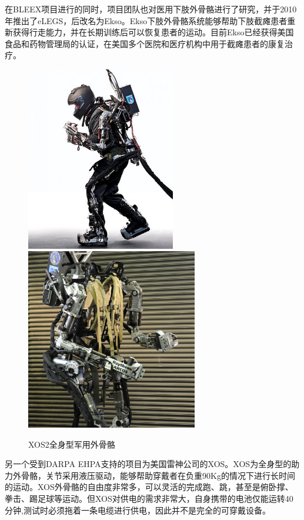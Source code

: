 在BLEEX项目进行的同时，项目团队也对医用下肢外骨骼进行了研究，并于2010年推出了eLEGS\cite{p9}，后改名为Ekso。Ekso下肢外骨骼系统能够帮助下肢截瘫患者重新获得行走能力，并在长期训练后可以恢复患者的运动。目前Ekso已经获得美国食品和药物管理局的认证，在美国多个医院和医疗机构中用于截瘫患者的康复治疗。
\begin{figure}[htb]
    \label{fig:sub1}{\includegraphics[width=6.5cm]{fig/f6_XOS.jpg}}\quad
    \label{fig:sub2}{\includegraphics[width=7.5cm]{fig/f7_XOS.jpg}}
    \caption{XOS2全身型军用外骨骼\cite{p8}}
    \label{fig:subfigs}
\end{figure}

另一个受到DARPA EHPA支持的项目为美国雷神公司的XOS\cite{p8}。XOS为全身型的助力外骨骼，关节采用液压驱动，能够帮助穿戴者在负重90Kg的情况下进行长时间的运动。XOS外骨骼的自由度非常多，可以灵活的完成跑、跳，甚至是俯卧撑、拳击、踢足球等运动。但XOS对供电的需求非常大，自身携带的电池仅能运转40分钟,测试时必须拖着一条电缆进行供电，因此并不是完全的可穿戴设备。

